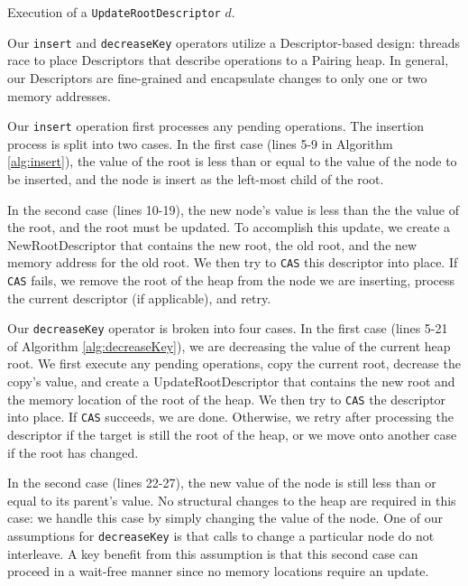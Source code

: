 \documentclass{acm_proc_article-sp}
\begin{document}
\begin{algorithm}
  \caption{Execution of a \texttt{UpdateRootDescriptor} $d$.}
  \label{alg:newroot}
\end{algorithm}

Our \texttt{insert} and \texttt{decreaseKey} operators utilize
a Descriptor-based design: threads race to place Descriptors that
describe operations to a Pairing heap. In general, our Descriptors
are fine-grained and encapsulate changes to only one or two memory addresses.

Our \texttt{insert} operation first processes any pending operations.
The insertion process is split into two cases. In the first case
(lines 5-9 in Algorithm \ref{alg:insert}), the value of the
root is less than or equal to the value of the node to be inserted,
and the node is insert as the left-most child of the root.

In the second case (lines 10-19), the new node's value is less than the 
the value of the root, and the root must be updated. To accomplish
this update, we create a NewRootDescriptor that contains the
new root, the old root, and the new memory address for the old root.
We then try to \texttt{CAS} this descriptor into place. If \texttt{CAS}
fails, we remove the root of the heap from the node we are inserting, process
the current descriptor (if applicable), and retry.

Our \texttt{decreaseKey} operator is broken into four cases.
In the first case (lines 5-21 of Algorithm \ref{alg:decreaseKey}),
we are decreasing the value of the current heap root. We first
execute any pending operations, copy the current root, decrease
the copy's value, and create a UpdateRootDescriptor that contains
the new root and the memory location of the root of the heap. We then try
to \texttt{CAS} the descriptor into place. If \texttt{CAS} succeeds,
we are done. Otherwise, we retry after processing the descriptor
if the target is still the root of the heap, or we move onto
another case if the root has changed.

In the second case (lines 22-27), the new value of the node is still less than or equal to
its parent's value. No structural changes to the heap are required in this case:
we handle this case by simply changing the value of the node. One of our assumptions
for \texttt{decreaseKey} is that calls to change a particular node do not
interleave. A key benefit from this assumption is that this second case can proceed
in a wait-free manner since no memory locations require an update.
\end{document}
